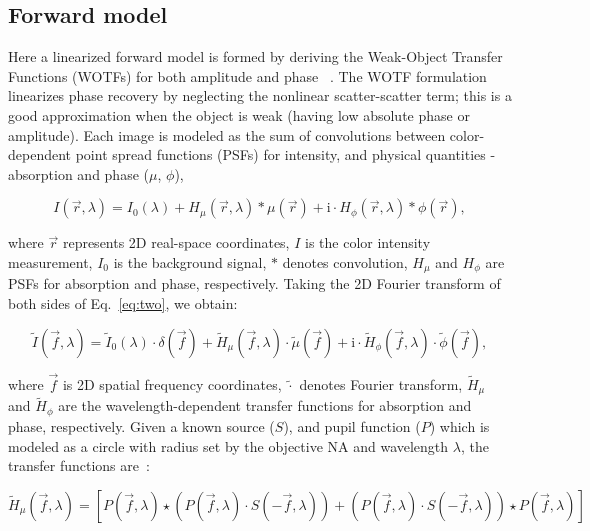 \subsection{Forward model}
\label{sec:forward}
Here a linearized forward model is formed by deriving the Weak-Object Transfer Functions (WOTFs) for both amplitude and phase ~\cite{Claus2015, tian2015quantitative, Hamilton1984a}. The WOTF formulation linearizes phase recovery by neglecting the nonlinear scatter-scatter term; this is a good approximation when the object is weak (having low absolute phase or amplitude). Each image is modeled as the sum of convolutions between color-dependent point spread functions (PSFs) for intensity, and physical quantities - absorption and phase ($\mu$, $\phi$),

\begin{equation}
	I(\vec{r},\lambda) = I_{0}(\lambda) +H_{\mu}(\vec{r},\lambda) * \mu(\vec{r}) + \mathrm{i}\cdot H_{\phi}(\vec{r},\lambda) * \phi(\vec{r}),
	\label{eq:two}
\end{equation}

\noindent where $\vec{r}$ represents 2D real-space coordinates, $I$ is the color intensity measurement, $I_0$ is the background signal, $*$ denotes convolution, $H_{\mu}$ and $H_{\phi}$ are PSFs for absorption and phase, respectively. Taking the 2D Fourier transform of both sides of Eq.~\ref{eq:two}, we obtain:

\begin{equation}
	\tilde{I}(\vec{f},\lambda) = \tilde{I}_0(\lambda)\cdot\delta(\vec{f})+ \tilde{H}_{\mu}(\vec{f},\lambda)  \cdot \tilde{\mu}(\vec{f})+ \mathrm{i}\cdot\tilde{H}_{\phi}(\vec{f},\lambda)  \cdot \tilde{\phi}(\vec{f}),
\end{equation}

\noindent where $\vec{f}$ is 2D spatial frequency coordinates, $\tilde{\cdot}$ denotes Fourier transform,  $\tilde{H}_{\mu}$ and $\tilde{H}_{\phi}$ are the wavelength-dependent transfer functions for absorption and phase, respectively. Given a known source ($S$), and pupil function ($P$) which is modeled as a circle with radius set by the objective NA and wavelength $\lambda$, the transfer functions are~\cite{Claus2015,tian2015quantitative}:

\begin{equation}\label{WOTFre}
\tilde{H}_{\mu}(\vec{f},\lambda) = \left[  P(\vec{f},\lambda) \star (P(\vec{f},\lambda)\cdot S(-\vec{f},\lambda))+ (P(\vec{f},\lambda) \cdot S(-\vec{f},\lambda)) \star P(\vec{f},\lambda)\right]
\end{equation}

